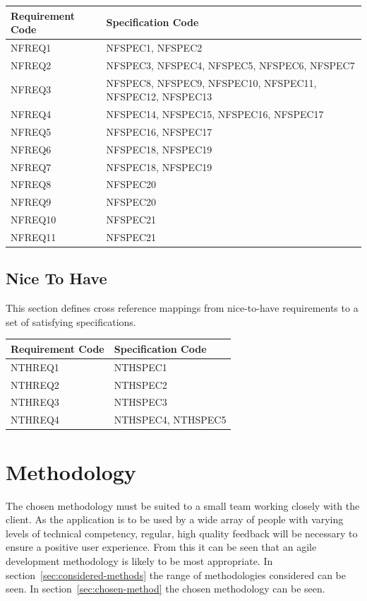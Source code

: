 \documentclass[11pt,a4paper]{article}
\begin{document}
\begin{longtable}{|p{2.7cm}|p{10cm}|}
\hline
\textbf{Requirement Code} & \textbf{Specification Code} \\

\hline 
{NFREQ1} &
{NFSPEC1, NFSPEC2}\\\hline
{NFREQ2} &
{NFSPEC3, NFSPEC4, NFSPEC5, NFSPEC6, NFSPEC7}\\\hline
{NFREQ3} &
{NFSPEC8, NFSPEC9, NFSPEC10, NFSPEC11, NFSPEC12, NFSPEC13}\\\hline
{NFREQ4} &
{NFSPEC14, NFSPEC15, NFSPEC16, NFSPEC17}\\\hline
{NFREQ5} &
{NFSPEC16, NFSPEC17}\\\hline
{NFREQ6} &
{NFSPEC18, NFSPEC19}\\\hline
{NFREQ7} &
{NFSPEC18, NFSPEC19}\\\hline
{NFREQ8} &
{NFSPEC20}\\\hline
{NFREQ9} &
{NFSPEC20}\\\hline
{NFREQ10} &
{NFSPEC21}\\\hline
{NFREQ11} &
{NFSPEC21}\\\hline
\end{longtable}

\subsection{Nice To Have}

This section defines cross reference mappings from nice-to-have requirements to a set of satisfying specifications.

\begin{longtable}{|p{2.7cm}|p{10cm}|}
\hline
\textbf{Requirement Code} & \textbf{Specification Code} \\

\hline 
{NTHREQ1} &
{NTHSPEC1}\\\hline
{NTHREQ2} &
{NTHSPEC2}\\\hline
{NTHREQ3} &
{NTHSPEC3}\\\hline
{NTHREQ4} &
{NTHSPEC4, NTHSPEC5}\\\hline
\end{longtable}

\section{Methodology}
\label{sec:methodologies}
The chosen methodology must be suited to a small team working closely with the client. As the application is to be used by a wide array of people with varying levels of technical competency, regular, high quality feedback will be necessary to ensure a positive user experience. From this it can be seen that an agile development methodology is likely to be most appropriate. In section~\ref{sec:considered-methods} the range of methodologies considered can be seen. In section~\ref{sec:chosen-method} the chosen methodology can be seen.
\end{document}
